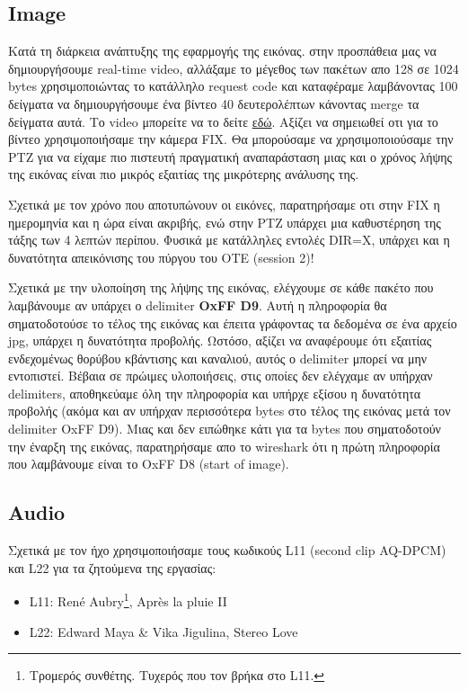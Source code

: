 \documentclass[hidelinks, 12pt, a4paper]{article}
\begin{document}
\subsection{Image}

Κατά τη διάρκεια ανάπτυξης της εφαρμογής της εικόνας. στην προσπάθεια μας να δημιουργήσουμε real-time video, αλλάξαμε το μέγεθος των πακέτων απο 128 σε 1024 bytes χρησιμοποιώντας το κατάλληλο request code και καταφέραμε λαμβάνοντας 100 δείγματα να δημιουργήσουμε ένα βίντεο 40 δευτερολέπτων κάνοντας merge τα δείγματα αυτά. Το video μπορείτε να το δείτε \href{https://drive.google.com/file/d/1yfwckvGBr8YteigF3ainMJMXwLOzjZ9u/view?usp=sharing}{εδώ}. Αξίζει να σημειωθεί οτι για το βίντεο χρησιμοποιήσαμε την κάμερα FIX. Θα μπορούσαμε να χρησιμοποιούσαμε την PTZ για να είχαμε πιο πιστευτή πραγματική αναπαράσταση μιας και ο χρόνος λήψης της εικόνας είναι πιο μικρός εξαιτίας της μικρότερης ανάλυσης της.

Σχετικά με τον χρόνο που αποτυπώνουν οι εικόνες, παρατηρήσαμε οτι στην FIX η ημερομηνία και η ώρα είναι ακριβής, ενώ στην PTZ υπάρχει μια καθυστέρηση της τάξης των 4 λεπτών περίπου. Φυσικά με κατάλληλες εντολές DIR=X, υπάρχει και η δυνατότητα απεικόνισης του πύργου του ΟΤΕ (session 2)!

Σχετικά με την υλοποίηση  της λήψης της εικόνας, ελέγχουμε σε κάθε πακέτο που λαμβάνουμε αν υπάρχει ο delimiter \textbf{OxFF D9}. Αυτή η πληροφορία θα σηματοδοτούσε το τέλος της εικόνας και έπειτα γράφοντας τα δεδομένα σε ένα αρχείο jpg, υπάρχει η δυνατότητα προβολής. Ωστόσο, αξίζει να αναφέρουμε ότι εξαιτίας ενδεχομένως θορύβου κβάντισης και καναλιού, αυτός ο delimiter μπορεί να μην εντοπιστεί. Βέβαια σε πρώιμες υλοποιήσεις, στις οποίες δεν ελέγχαμε αν υπήρχαν delimiters, αποθηκεύαμε όλη την πληροφορία και υπήρχε εξίσου η δυνατότητα προβολής (ακόμα και αν υπήρχαν περισσότερα bytes στο τέλος της εικόνας μετά τον delimiter OxFF D9). Μιας και δεν ειπώθηκε κάτι για τα bytes που σηματοδοτούν την έναρξη της εικόνας, παρατηρήσαμε απο το wireshark ότι η πρώτη πληροφορία που λαμβάνουμε είναι το OxFF D8 (start of image).

\subsection{Audio}

Σχετικά με τον ήχο χρησιμοποιήσαμε τους κωδικούς L11 (second clip AQ-DPCM) και L22  για τα ζητούμενα της εργασίας: 
\begin{itemize}
    \item L11: René Aubry\footnote{Τρομερός συνθέτης. Τυχερός που τον βρήκα στο L11.}, Après la pluie II
    \item L22: Edward Maya \& Vika Jigulina, Stereo Love
\end{itemize}
\end{document}
